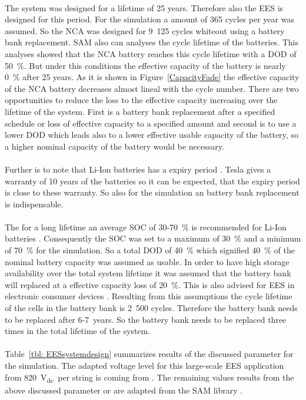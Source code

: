 \documentclass[Master,MEE,english]{twbook}%
\begin{document}
\\
The system was designed for a lifetime of 25 years. Therefore also the EES is designed for this period. For the simulation a amount of 365 cycles per year was assumed. So the NCA was designed for 9~125 cycles whiteout using a battery bank replacement. SAM also can analyses the cycle lifetime of the batteries. This analyses showed that the NCA battery reaches this cycle lifetime with a DOD of 50~\%. But under this conditions the effective capacity of the battery is nearly 0~\% after 25 years. As it is shown in Figure~\ref{CapacityFade} the effective capacity of the NCA battery decreases almost lineal with the cycle number. There are two opportunities to reduce the loss to the effective capacity increasing over the lifetime of the system. First is a battery bank replacement after a specified schedule or loss of effective capacity to a specified amount and second is to use a lower DOD which leads also to a lower effective usable capacity of the battery, so a higher nominal capacity of the battery would be necessary.\\
\\
Further is to note that Li-Ion batteries has a expiry period \cite{Jossen2006}. Tesla gives a warranty of 10 years of the batteries \cite{Shahan2015} so it can be expected, that the expiry period is close to these warranty. So also for the simulation an battery bank replacement is indispensable.\\
\\
The for a long lifetime an average SOC of 30-70~\% is recommended for Li-Ion batteries \cite{Jossen2006}. Consequently the SOC was set to a maximum of 30~\% and a minimum of 70~\% for the simulation. So a total DOD of 40~\% which signified 40~\% of the nominal battery capacity was assumed as usable. In order to have high storage availability over the total system lifetime it was assumed that the battery bank will replaced at a effective capacity loss of 20~\%. This is also advised for EES in electronic consumer devices \cite{Spotnitz2003}. Resulting from this assumptions the cycle lifetime of the cells in the battery bank is 2~500 cycles. Therefore the battery bank needs to be replaced after 6-7~years. So the battery bank needs to be replaced three times in the total lifetime of the system. \\
\\
Table~\ref{tbl: EESsystemdesign} summarizes results of the discussed parameter for the simulation. The adapted voltage level for this large-scale EES application from 820~V\textsubscript{dc}\ per string is coming from \cite{Leuthold2014}. The remaining values results from the above discussed parameter or are adapted from the SAM library \cite{Diorio2015}. 
\end{document}
